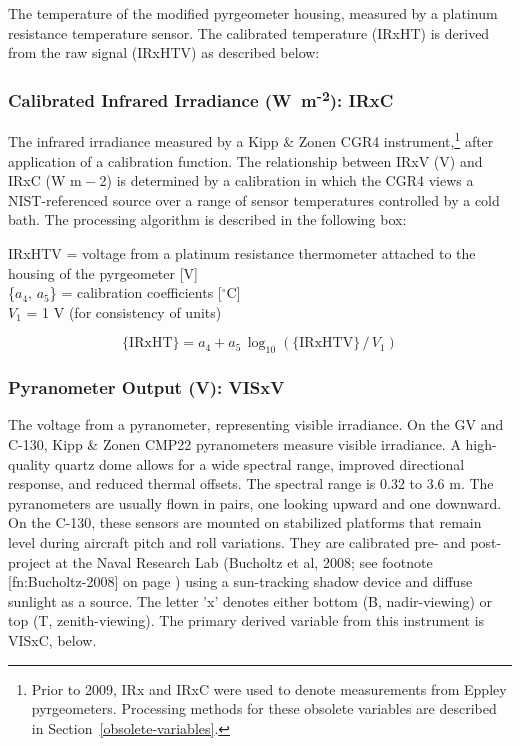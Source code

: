\documentclass[
  english,
]{book}
\begin{document}
The temperature of the modified pyrgeometer housing, measured by a platinum resistance temperature sensor. The calibrated temperature (IRxHT) is derived from the raw signal (IRxHTV) as described below:

\hypertarget{irxc}{%
\subsubsection*{\texorpdfstring{Calibrated Infrared Irradiance (W~m\textsuperscript{-2}): IRxC}{Calibrated Infrared Irradiance (W~m-2): IRxC}}\label{irxc}}

The infrared irradiance measured by a Kipp \& Zonen CGR4 instrument,\footnote{Prior to 2009, IRx and IRxC were used to denote measurements from Eppley pyrgeometers. Processing methods for these obsolete variables are described in Section~\ref{obsolete-variables}.}
after application of a calibration function. The relationship between IRxV (V) and IRxC (W m{ − 2}) is determined by a calibration in which the CGR4 views a NIST-referenced source over a range of sensor temperatures controlled by a cold bath. The processing algorithm is described in the following box:

IRxHTV = voltage from a platinum resistance thermometer attached to the housing
of the pyrgeometer {[}V{]}\\
\{\(a_4,\,a_5\)\} = calibration coefficients {[}\(^\circ\)C{]}\\
\(V_1\) = 1 V (for consistency of units)

\begin{equation}
\mathrm{\{IRxHT\}} = a_4 + a_5\,\log_{10}(\mathrm{\{IRxHTV\}}\,/\,V_1)
\label{eq:IRxHTbox}
\end{equation}

\hypertarget{visxv}{%
\subsubsection*{Pyranometer Output (V): VISxV}\label{visxv}}

The voltage from a pyranometer, representing visible irradiance. On the GV and C-130, Kipp \& Zonen CMP22 pyranometers measure visible irradiance. A high-quality quartz dome allows for a wide spectral range, improved directional response, and reduced thermal offsets. The spectral range is 0.32 to 3.6 m. The pyranometers are usually flown in pairs, one looking upward and one downward. On the C-130, these sensors are mounted on stabilized platforms that remain level during aircraft pitch and roll variations. They are calibrated pre- and post-project at the Naval Research Lab (Bucholtz et al, 2008; see footnote {[}fn:Bucholtz-2008{]} on page ) using a sun-tracking shadow device and diffuse sunlight as a source. The letter 'x' denotes either bottom (B, nadir-viewing) or top (T, zenith-viewing). The primary derived variable from this instrument is VISxC, below.
\end{document}
